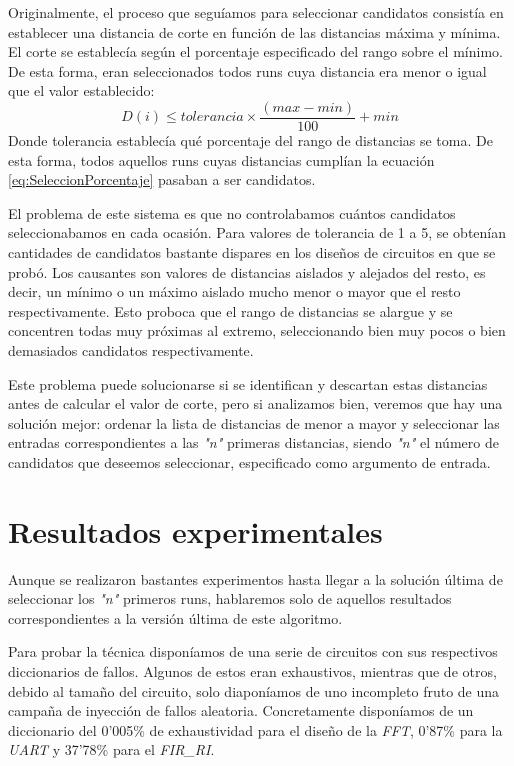 Originalmente, el proceso que seguíamos para seleccionar candidatos consistía en
establecer una distancia de corte en función de las distancias máxima y mínima. El
corte se establecía según el porcentaje especificado del rango sobre el mínimo. De
esta forma, eran seleccionados todos runs cuya distancia era menor o igual que el
valor establecido:
\begin{equation}
    \label{eq:SeleccionPorcentaje}
    D(i) \leq tolerancia \times \frac{(max - min)}{100} + min
\end{equation}
Donde tolerancia establecía qué porcentaje del rango de distancias se toma. De 
esta forma, todos aquellos runs cuyas distancias cumplían la ecuación
\ref{eq:SeleccionPorcentaje} pasaban a ser candidatos.

El problema de este sistema es que no controlabamos cuántos candidatos
seleccionabamos en cada ocasión. Para valores de tolerancia de 1 a 5, se obtenían
cantidades de candidatos bastante dispares en los diseños de circuitos en que se
probó. Los causantes son valores de distancias aislados y alejados del resto, es
decir, un mínimo o un máximo aislado mucho menor o mayor que el resto
respectivamente. Esto proboca que el rango de distancias se alargue y se
concentren todas muy próximas al extremo, seleccionando bien muy pocos o bien
demasiados candidatos respectivamente.

Este problema puede solucionarse si se identifican y descartan estas distancias
antes de calcular el valor de corte, pero si analizamos bien, veremos que hay una 
solución mejor: ordenar la lista de distancias de menor a mayor y seleccionar las 
entradas correspondientes a las \textit{"n"} primeras distancias, siendo 
\textit{"n"} el número de candidatos que deseemos seleccionar, especificado como 
argumento de entrada.

\section{Resultados experimentales}
\label{sec:LevenResults}
Aunque se realizaron bastantes experimentos hasta llegar a la solución última de
seleccionar los \textit{"n"} primeros runs, hablaremos solo de aquellos resultados
correspondientes a la versión última de este algoritmo.

Para probar la técnica disponíamos de una serie de circuitos con sus respectivos
diccionarios de fallos. Algunos de estos eran exhaustivos, mientras que de otros,
debido al tamaño del circuito, solo diaponíamos de uno incompleto fruto de una
campaña de inyección de fallos aleatoria. Concretamente disponíamos de un
diccionario del 0'005\% de exhaustividad para el diseño de la \textit{FFT}, 0'87\%
para la \textit{UART} y 37'78\% para el \textit{FIR\_RI}.

